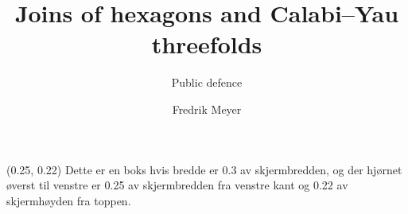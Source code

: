 \documentclass[UKenglish]{beamer}
\title{Joins of hexagons and Calabi--Yau threefolds}
\subtitle{Public defence}
\author{Fredrik Meyer}
\begin{document}
\begin{frame}

    \begin{textblock}{0.3}(0.25, 0.22)
        Dette er en boks hvis bredde er \alert{0.3} av skjermbredden, og der hjørnet øverst til venstre er \alert{0.25} av skjermbredden fra venstre kant og \alert{0.22} av skjermhøyden fra toppen.
    \end{textblock}

\end{frame}
\end{document}
